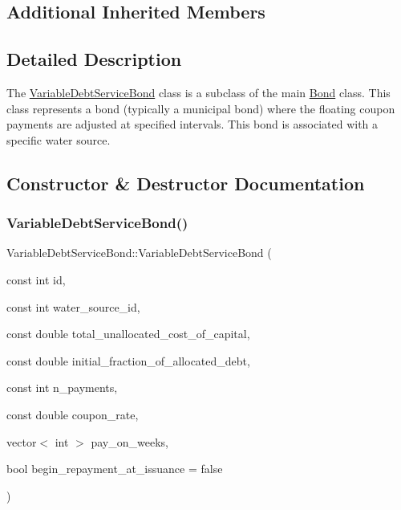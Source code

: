 \subsection*{Additional Inherited Members}


\subsection{Detailed Description}
The {\ttfamily \mbox{\hyperlink{classVariableDebtServiceBond}{Variable\+Debt\+Service\+Bond}}} class is a subclass of the main {\ttfamily \mbox{\hyperlink{classBond}{Bond}}} class. This class represents a bond (typically a municipal bond) where the floating coupon payments are adjusted at specified intervals. This bond is associated with a specific water source. 

\subsection{Constructor \& Destructor Documentation}
\mbox{\label{classVariableDebtServiceBond_adc0d18eba4f4a7c7d359640131225f55}} 
\subsubsection{\texorpdfstring{Variable\+Debt\+Service\+Bond()}{VariableDebtServiceBond()}}
{\footnotesize\ttfamily Variable\+Debt\+Service\+Bond\+::\+Variable\+Debt\+Service\+Bond (\begin{DoxyParamCaption}\item[{const int}]{id,  }\item[{const int}]{water\+\_\+source\+\_\+id,  }\item[{const double}]{total\+\_\+unallocated\+\_\+cost\+\_\+of\+\_\+capital,  }\item[{const double}]{initial\+\_\+fraction\+\_\+of\+\_\+allocated\+\_\+debt,  }\item[{const int}]{n\+\_\+payments,  }\item[{const double}]{coupon\+\_\+rate,  }\item[{vector$<$ int $>$}]{pay\+\_\+on\+\_\+weeks,  }\item[{bool}]{begin\+\_\+repayment\+\_\+at\+\_\+issuance = {\ttfamily false} }\end{DoxyParamCaption})}



